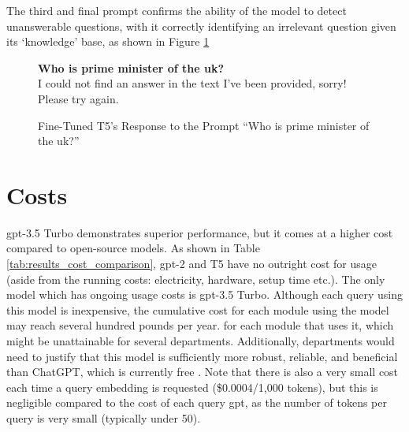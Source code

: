 The third and final prompt confirms the ability of the model to detect unanswerable questions, with it correctly identifying an irrelevant question given its `knowledge' base, as shown in Figure \ref{fig:results_t5_ex3}

\begin{figure}[ht!]
    \begin{itquote}
        \textbf{Who is prime minister of the uk?} \\
        I could not find an answer in the text I've been provided, sorry! Please try again.
    \end{itquote}
    \caption{Fine-Tuned T5's Response to the Prompt ``Who is prime minister of the uk?''}
    \label{fig:results_t5_ex3}
\end{figure}

\section{Costs}\label{sec:results_costs}
\acrshort{gpt}-3.5 Turbo demonstrates superior performance, but it comes at a higher cost compared to open-source models. As shown in Table \ref{tab:results_cost_comparison}, \acrshort{gpt}-2 and T5 have no outright cost for usage (aside from the running costs: electricity, hardware, setup time etc.). The only model which has ongoing usage costs is \acrshort{gpt}-3.5 Turbo. Although each query using this model is inexpensive, the cumulative cost for each module using the model may reach several hundred pounds per year. for each module that uses it, which might be unattainable for several departments. Additionally, departments would need to justify that this model is sufficiently more robust, reliable, and beneficial than ChatGPT, which is currently free \citep{ChatGPTrelease}. Note that there is also a very small cost each time a query embedding is requested (\$0.0004/1,000 tokens), but this is negligible compared to the cost of each query \acrshort{gpt}, as the number of tokens per query is very small (typically under 50).

